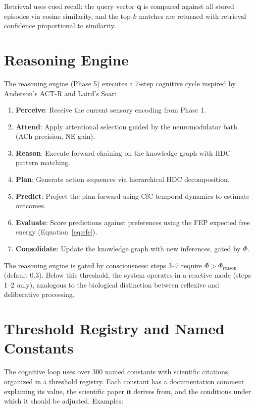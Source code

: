 \documentclass[12pt]{book}
\begin{document}
Retrieval uses cued recall: the query vector $\mathbf{q}$ is compared against all stored episodes via cosine similarity, and the top-$k$ matches are returned with retrieval confidence proportional to similarity.

\section{Reasoning Engine}

The reasoning engine (Phase 5) executes a 7-step cognitive cycle inspired by Anderson's ACT-R and Laird's Soar:

\begin{enumerate}
  \item \textbf{Perceive}: Receive the current sensory encoding from Phase 1.
  \item \textbf{Attend}: Apply attentional selection guided by the neuromodulator bath (ACh precision, NE gain).
  \item \textbf{Reason}: Execute forward chaining on the knowledge graph with HDC pattern matching.
  \item \textbf{Plan}: Generate action sequences via hierarchical HDC decomposition.
  \item \textbf{Predict}: Project the plan forward using CfC temporal dynamics to estimate outcomes.
  \item \textbf{Evaluate}: Score predictions against preferences using the FEP expected free energy (Equation~\ref{eq:efe}).
  \item \textbf{Consolidate}: Update the knowledge graph with new inferences, gated by $\Phi$.
\end{enumerate}

The reasoning engine is gated by consciousness: steps 3--7 require $\Phi > \Phi_{\text{reason}}$ (default 0.3). Below this threshold, the system operates in a reactive mode (steps 1--2 only), analogous to the biological distinction between reflexive and deliberative processing.

\section{Threshold Registry and Named Constants}

The cognitive loop uses over 300 named constants with scientific citations, organized in a threshold registry. Each constant has a documentation comment explaining its value, the scientific paper it derives from, and the conditions under which it should be adjusted. Examples:
\end{document}
